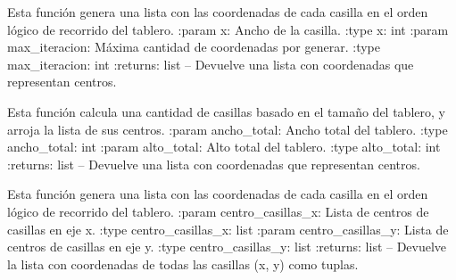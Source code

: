 \documentclass[letterpaper,10pt,english]{sphinxmanual}
\begin{document}
\begin{fulllineitems}
\begin{fulllineitems}
\end{fulllineitems}


\begin{fulllineitems}
\label{\detokenize{codigo:tablero.TableroSE.obtener_casillas}}
Esta función genera una lista con las coordenadas de cada casilla en el orden lógico de recorrido del tablero. 
:param x: Ancho de la casilla.
:type x: int
:param max\_iteracion: Máxima cantidad de coordenadas por generar.
:type max\_iteracion: int
:returns:  list -- Devuelve una lista con coordenadas que representan centros.

\end{fulllineitems}


\begin{fulllineitems}
\label{\detokenize{codigo:tablero.TableroSE.obtener_centro_casillas}}
Esta función calcula una cantidad de casillas basado en el tamaño del tablero, y arroja la lista de sus centros. 
:param ancho\_total: Ancho total del tablero.
:type ancho\_total: int
:param alto\_total: Alto total del tablero.
:type alto\_total: int
:returns:  list -- Devuelve una lista con coordenadas que representan centros.

\end{fulllineitems}


\begin{fulllineitems}
\label{\detokenize{codigo:tablero.TableroSE.obtener_orden_coordenadas}}
Esta función genera una lista con las coordenadas de cada casilla en el orden lógico de recorrido del tablero. 
:param centro\_casillas\_x: Lista de centros de casillas en eje x.
:type centro\_casillas\_x: list
:param centro\_casillas\_y: Lista de centros de casillas en eje y.
:type centro\_casillas\_y: list
:returns:  list -- Devuelve la lista con coordenadas de todas las casillas (x, y) como tuplas.

\end{fulllineitems}


\end{fulllineitems}
\end{document}
